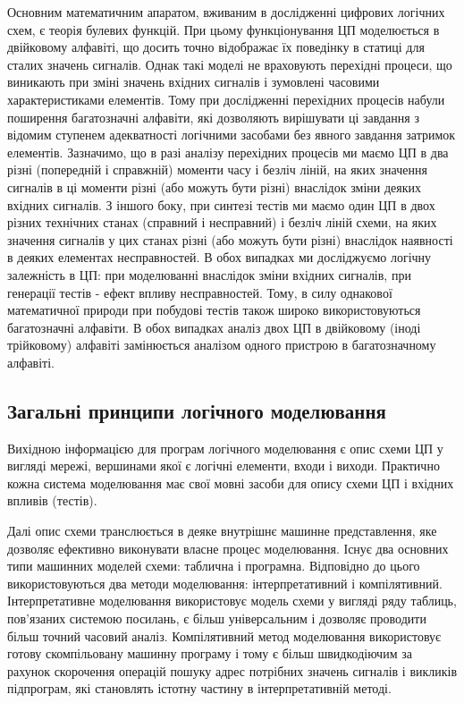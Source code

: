 \documentclass[12pt,a4paper]{article}
\begin{document}
Основним математичним апаратом, вживаним в дослідженні цифрових логічних схем, є теорія булевих функцій. При цьому функціонування ЦП моделюється в двійковому алфавіті, що досить точно відображає їх поведінку в статиці для сталих значень сигналів. Однак такі моделі не враховують перехідні процеси, що виникають при зміні значень вхідних сигналів і зумовлені часовими характеристиками елементів. Тому при дослідженні перехідних процесів набули поширення багатозначні алфавіти, які дозволяють вирішувати ці завдання з відомим ступенем адекватності логічними засобами без явного завдання затримок елементів. Зазначимо, що в разі аналізу перехідних процесів ми маємо ЦП в два різні (попередній і справжній) моменти часу і безліч ліній, на яких значення сигналів в ці моменти різні (або можуть бути різні) внаслідок зміни деяких вхідних сигналів. З іншого боку, при синтезі тестів ми маємо один ЦП в двох різних технічних станах (справний і несправний) і безліч ліній схеми, на яких значення сигналів у цих станах різні (або можуть бути різні) внаслідок наявності в деяких елементах несправностей. В обох випадках ми досліджуємо логічну залежність в ЦП: при моделюванні внаслідок зміни вхідних сигналів, при генерації тестів - ефект впливу несправностей. Тому, в силу однакової математичної природи при побудові тестів також широко використовуються багатозначні алфавіти. В обох випадках аналіз двох ЦП в двійковому (іноді трійковому) алфавіті замінюється аналізом одного пристрою в багатозначному алфавіті.

\subsection{Загальні принципи логічного моделювання}

Вихідною інформацією для програм логічного моделювання є опис схеми ЦП у вигляді мережі, вершинами якої є логічні елементи, входи і виходи. Практично кожна система моделювання має свої мовні засоби для опису схеми ЦП і вхідних впливів (тестів).

Далі опис схеми транслюється в деяке внутрішнє машинне представлення, яке дозволяє ефективно виконувати власне процес моделювання. Існує два основних типи машинних моделей схеми: таблична і програмна. Відповідно до цього використовуються два методи моделювання: інтерпретативний і компілятивний. Інтерпретативне моделювання використовує модель схеми у вигляді ряду таблиць, пов'язаних системою посилань, є більш універсальним і дозволяє проводити більш точний часовий аналіз. Компілятивний метод моделювання використовує готову скомпільовану машинну програму і тому є більш швидкодіючим за рахунок скорочення операцій пошуку адрес потрібних значень сигналів і викликів підпрограм, які становлять істотну частину в інтерпретативній методі.
\end{document}
